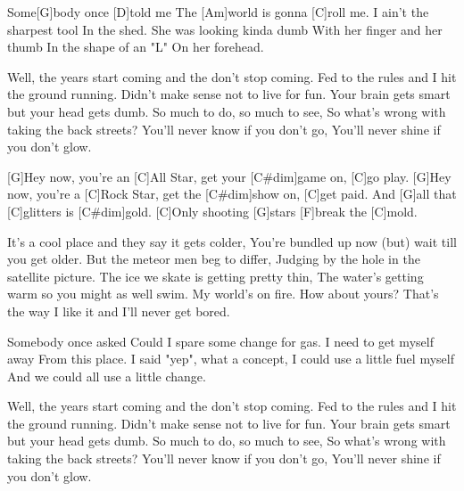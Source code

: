 

\begin{guitar}
	Some[G]body once [D]told me 
	The [Am]world is gonna [C]roll me.
	I ain't the sharpest tool
	In the shed.
	She was looking kinda dumb 
	With her finger and her thumb
	In the shape of an "L" 
	On her forehead.
	
	Well, the years start coming and the don't stop coming. 
	Fed to the rules and I hit the ground running.
	Didn't make sense not to live for fun. 
	Your brain gets smart but your head gets dumb.
	So much to do, so much to see,
	So what's wrong with taking the back streets?
	You'll never know if you don't go, 
	You'll never shine if you don't glow.
	
	[G]Hey now, you're an [C]All Star, get your [C#dim]game on, [C]go play.
	[G]Hey now, you're a [C]Rock Star, get the [C#dim]show on, [C]get paid.
	And [G]all that [C]glitters is [C#dim]gold.
	[C]Only shooting [G]stars [F]break the [C]mold.
	
	It's a cool place and they say it gets colder,
	You're bundled up now (but) wait till you get older.
	But the meteor men beg to differ, 
	Judging by the hole in the satellite picture.
	The ice we skate is getting pretty thin, 
	The water's getting warm so you might as well swim.
	My world's on fire. How about yours? 
	That's the way I like it and I'll never get bored.
	
	 
	
	
	 
	
	Somebody once asked 
	Could I spare some change for gas.
	I need to get myself away
	From this place.
	I said "yep", what a concept, 
	I could use a little fuel myself
	And we could all use a little change.
	
	Well, the years start coming and the don't stop coming. 
	Fed to the rules and I hit the ground running.
	Didn't make sense not to live for fun. 
	Your brain gets smart but your head gets dumb.
	So much to do, so much to see,
	So what's wrong with taking the back streets?
	You'll never know if you don't go, 
	You'll never shine if you don't glow.
	
	 
	
\end{guitar}
